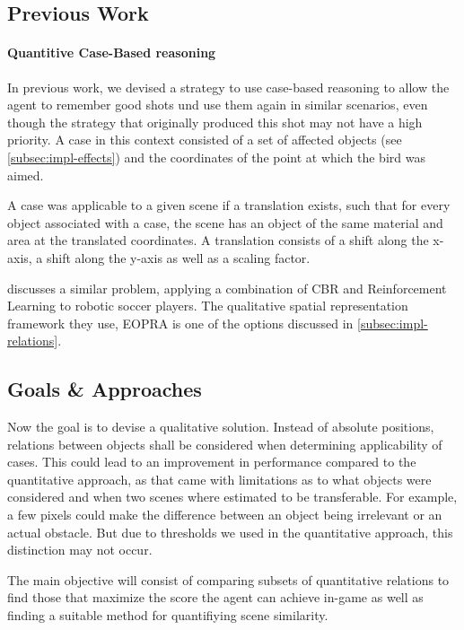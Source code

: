 \subsection{Previous Work}
\paragraph{Quantitive Case-Based reasoning}\label{par:quantititve-cbr}
In previous work, we devised a strategy to use case-based reasoning to allow the agent to remember good shots und use them again in similar scenarios, even though the strategy that originally produced this shot may not have a high priority.
A case in this context consisted of a set of affected objects (see \ref{subsec:impl-effects}) and the coordinates of the point at which the bird was aimed.

A case was applicable to a given scene if a translation exists, such that for every object associated with a case, the scene has an object of the same material and area at the translated coordinates. A translation consists of a shift along the x-axis, a shift along the y-axis as well as a scaling factor.



\cite{QCBR} discusses a similar problem, applying a combination of \ac{CBR} and Reinforcement Learning to robotic soccer players.
The qualitative spatial representation framework they use, \ac{EOPRA} is one of the options discussed in \ref{subsec:impl-relations}.



\subsection{Goals \& Approaches}

Now the goal is to devise a qualitative solution.
Instead of absolute positions, relations between objects shall be considered when determining applicability of cases.
This could lead to an improvement in performance compared to the quantitative approach, as that came with limitations as to what objects were considered and when two scenes where estimated to be transferable. %
For example, a few pixels could make the difference between an object being irrelevant or an actual obstacle.
But due to thresholds we used in the quantitative approach, this distinction may not occur. %

The main objective will consist of comparing subsets of quantitative relations to find those that maximize the score the agent can achieve in-game as well as finding a suitable method for quantifiying scene similarity.

